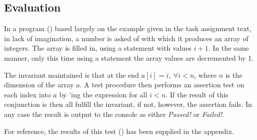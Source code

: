 \subsection{Evaluation}
In a program () based
largely on the example given in the task assignment text, in lack of
imagination, a number is asked of
with which it produces an array of integers. The array is filled in, using a
 statement with values $i + 1$. In the same manner, only this
time using a  statement the array values are decremented
by 1.

The invariant maintained is that at the end $a[i] = i,{\ }\forall i < n$,
where $n$ is the dimension of the array $a$. A test procedure then performs an assertion
test on each index into $a$ by 'ing the expression for all $i < n$.
If the result of this conjunction is  then all fulfill the
invariant, if not, however, the assertion fails. In any case the result is
output to the console as either {\it Passed!} or {\it Failed!}.

For reference, the results of this test
() has been supplied in the appendix.
